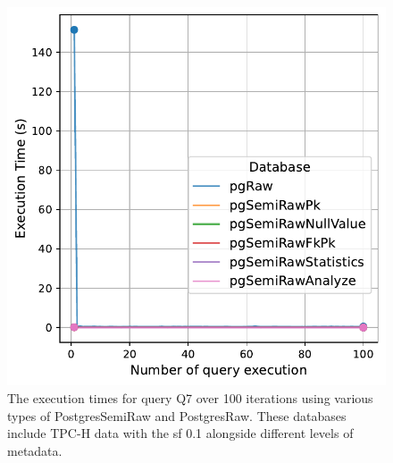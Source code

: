 \begin{figure}[hbt!]
\centering
\includegraphics[width=1.0\linewidth]{charts-eval-exp-time/execution_time_db_type_Q7.pdf}
\caption[Q7:result]{The execution times for query Q7 over 100 iterations using various types of PostgresSemiRaw and PostgresRaw. These databases include TPC-H data with the \acrshort{sf} 0.1 alongside different levels of metadata.}
\label{fig:execution_time_db_type_Q7}
\end{figure}
